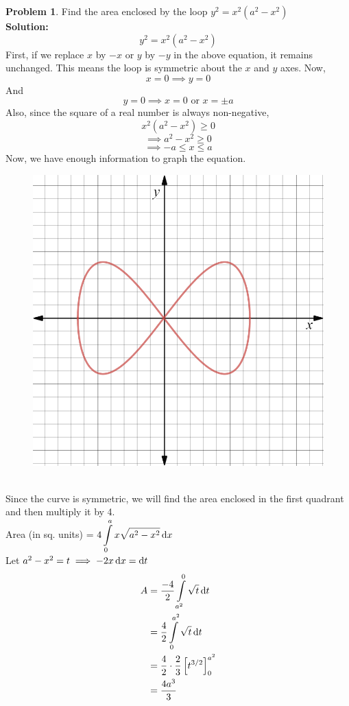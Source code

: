 \documentclass[14]{article}
\theoremstyle{definition}
\newtheorem{prob}{Problem}
\theoremstyle{case}
\begin{document}
\pagebreak
\begin{prob}
Find the area enclosed by the loop $y^2 = x^2\left( a^2 - x^2 \right)$\\
\textbf{Solution: }
\[y^2 = x^2 \left( a^2 - x^2 \right)\]
First, if we replace $x$ by $-x$ or $y$ by $-y$ in the above equation, it remains unchanged. This means the loop is symmetric about the $x$ and $y$ axes.
Now,
\[x = 0 \implies y = 0\]
And
\[y = 0 \implies x = 0 \text{ or } x = \pm a\]
Also, since the square of a real number is always non-negative,
\[x^2(a^2 - x^2) \geq 0\]
\[\implies a^2 - x^2 \geq 0\]
\[\implies -a \leq x \leq a\]
Now, we have enough information to graph the equation.
\begin{figure}[h]\centering
\includegraphics[scale=.25]{images/loop2}
\end{figure}\\
Since the curve is symmetric, we will find the area enclosed in the first quadrant and then multiply it by 4.\\
Area (in sq. units) = $4\displaystyle\int\limits_0^a x\sqrt{a^2 - x^2} \dif x$\\
Let $a^2 - x^2 = t \implies -2x \dif x = \dif t$
\begin{align*}
A &= \dfrac{-4}2 \int\limits_{a^2}^{0} \sqrt{t} \dif t\\
&= \dfrac42 \int\limits_0^{a^2} \sqrt t \dif t\\
&= \dfrac42 \cdot \dfrac23 \left[ t^{3/2} \right]_0^{a^2}\\
&= \dfrac{4a^3}3
\end{align*}
\end{prob}
\pagebreak
\end{document}
